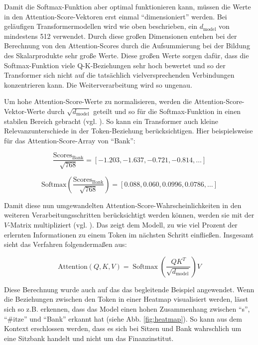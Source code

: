 Damit die Softmax-Funktion aber optimal funktionieren kann, müssen die Werte in den Attention-Score-Vektoren erst einmal \enquote{dimensioniert} werden.
Bei geläufigen Transformermodellen wird wie oben beschrieben, ein \( d_{\text{model}} \) von mindestens 512 verwendet.
Durch diese großen Dimensionen entehen bei der Berechnung von den Attention-Scores durch die Aufsummierung bei der Bildung des Skalarprodukte sehr große Werte.
Diese großen Werte sorgen dafür, dass die Softmax-Funktion viele Q-K-Beziehungen sehr hoch bewertet und so der Transformer sich nicht auf die tatsächlich vielversprechenden Verbindungen konzentrieren kann.
Die Weiterverarbeitung wird so ungenau.

Um hohe Attention-Score-Werte zu normalisieren, werden die Attention-Score-Vektor-Werte durch \( \sqrt{d_{\text{model}}} \) geteilt und so für die Softmax-Funktion in einen stabilen Bereich gebracht (vgl. \cite[S. 4]{attention}).
So kann ein Transformer auch kleine Relevanzunterschiede in der Token-Beziehung berücksichtigen.
Hier beispielsweise für das Attention-Score-Array von \enquote{Bank}:

\[
\frac{\text{Scores}_{\text{Bank}}}{\sqrt{768}} = [-1.203, -1.637, -0.721, -0.814, \dots]
\]

\[
\text{Softmax}\left(\frac{\text{Scores}_{\text{Bank}}}{\sqrt{768}}\right) = [0.088, 0.060, 0.0996, 0.0786, \dots]
\]

Damit diese nun umgewandelten Attention-Score-Wahrscheinlichkeiten in den weiteren Verarbeitungsschritten berücksichtigt werden können, werden sie mit der \( V \)-Matrix multipliziert (vgl. \cite[S. 4]{attention}). 
Das zeigt dem Modell, zu wie viel Prozent der erlernten Informationen zu einem Token im nächsten Schritt einfließen.
Insgesamt sieht das Verfahren folgendermaßen aus:

\[
\text{Attention}(Q, K, V) = \operatorname{Softmax}\left(\frac{QK^T}{\sqrt{d_{\text{model}}}}\right) V
\]

Diese Berechnung wurde auch auf das das begleitende Beispiel angewendet.
Wenn die Beziehungen zwischen den Token in einer Heatmap visualisiert werden, lässt sich so z.B. erkennen, dass das Model einen hohen Zusammenhang zwischen \enquote{s}, \enquote{#itze} und \enquote{Bank} erkannt hat (siehe Abb. \ref{fig:heatmap}). 
So kann aus dem Kontext erschlossen werden, dass es sich bei Sitzen und Bank wahrschlich um eine Sitzbank handelt und nicht um das Finanzinstitut.

